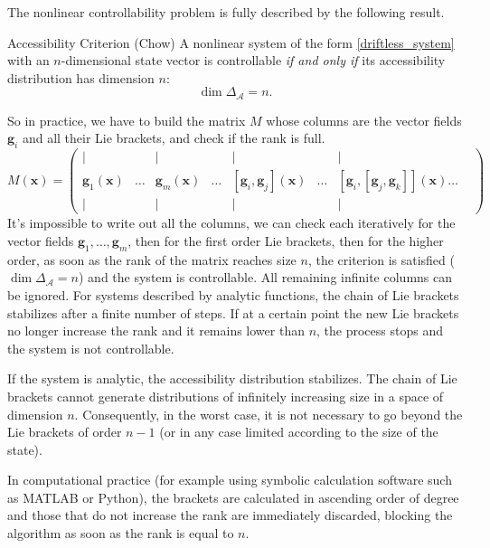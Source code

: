 \documentclass[10pt, a4paper]{report}
\begin{document}
\noindent The nonlinear controllability problem is fully described by the following result.
\begin{boxtheorem}{Accessibility Criterion (Chow)}{}
    A nonlinear system of the form \eqref{driftless_system} with an $n$-dimensional state vector is controllable \textit{if and only if} its accessibility distribution has dimension $n$:\begin{equation}
        \dim\Delta_{\mathcal A}=n.
    \end{equation}
\end{boxtheorem}
So in practice, we have to build the matrix $M$ whose columns are the vector fields $\mathbf g_i$ and all their Lie brackets, and check if the rank is full.\begin{equation}
    M(\mathbf x)=\begin{pmatrix}
          |& &| & &| & &|&\\
        \mathbf g_1(\mathbf x)&\dots&\mathbf g_m(\mathbf x)&\dots &[\mathbf g_i,\mathbf g_j](\mathbf x)&\dots&[\mathbf g_i,[\mathbf g_j,\mathbf g_k]](\mathbf x)\dots\\
         |& &| & &| & &|&
    \end{pmatrix}
\end{equation}
It's impossible to write out all the columns, we can check each iteratively for the vector fields $\mathbf g_1,\dots,\mathbf g_m$, then for the first order Lie brackets, then for the higher order,  as soon as the rank of the matrix reaches size $n$, the criterion is satisfied ($\dim \Delta_{\mathcal{A}} = n$) and the system is controllable. All remaining infinite columns can be ignored. For systems described by analytic functions, the chain of Lie brackets stabilizes after a finite number of steps. If at a certain point the new Lie brackets no longer increase the rank and it remains lower than $n$, the process stops and the system is not controllable. \begin{boxproposition}{}{}
If the system is analytic, the accessibility distribution stabilizes. The chain of Lie brackets cannot generate distributions of infinitely increasing size in a space of dimension $n$. Consequently, in the worst case, it is not necessary to go beyond the Lie brackets of order $n-1$ (or in any case limited according to the size of the state).
\end{boxproposition}
In computational practice (for example using symbolic calculation software such as MATLAB or Python), the brackets are calculated in ascending order of degree and those that do not increase the rank are immediately discarded, blocking the algorithm as soon as the rank is equal to $n$.
\end{document}
